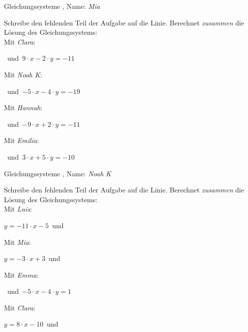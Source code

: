 \newpage
\begin{center}\large Gleichungssysteme
, Name: \emph{Mia}\end{center}
Schreibe den fehlenden Teil der Aufgabe auf die Linie. Berechnet \emph{zusammen} die Lösung des Gleichungssystems:
\\
\vfill Mit \emph{Clara}:
\begin{center}\underline{}
\mbox{ }und\mbox{ }$9\cdot x-2\cdot y=-11$\end{center}
\vfill Mit \emph{Noah K}:
\begin{center}\underline{}
\mbox{ }und\mbox{ }$-5\cdot x-4\cdot y=-19$\end{center}
\vfill Mit \emph{Hannah}:
\begin{center}\underline{}
\mbox{ }und\mbox{ }$-9\cdot x+2\cdot y=-11$\end{center}
\vfill Mit \emph{Emilia}:
\begin{center}\underline{}
\mbox{ }und\mbox{ }$3\cdot x+5\cdot y=-10$\end{center}
\newpage
\begin{center}\large Gleichungssysteme
, Name: \emph{Noah K}\end{center}
Schreibe den fehlenden Teil der Aufgabe auf die Linie. Berechnet \emph{zusammen} die Lösung des Gleichungssystems:
\\
\vfill Mit \emph{Luis}:
\begin{center}$y=-11\cdot x-5$\mbox{ }und\mbox{ }\underline{}
\end{center}
\vfill Mit \emph{Mia}:
\begin{center}$y=-3\cdot x+3$\mbox{ }und\mbox{ }\underline{}
\end{center}
\vfill Mit \emph{Emma}:
\begin{center}\underline{}
\mbox{ }und\mbox{ }$-5\cdot x-4\cdot y=1$\end{center}
\vfill Mit \emph{Clara}:
\begin{center}$y=8\cdot x-10$\mbox{ }und\mbox{ }\underline{}
\end{center}
